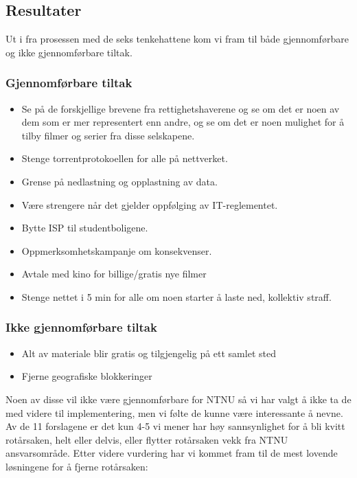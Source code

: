 \subsection{Resultater}
Ut i fra prosessen med de seks tenkehattene kom vi fram til både gjennomførbare og ikke gjennomførbare tiltak. 
\subsubsection*{Gjennomførbare tiltak}
\begin{itemize}
    \item Se på de forskjellige brevene fra rettighetshaverene og se om det er noen av dem som er mer representert enn andre, og se om det er noen mulighet for å tilby filmer og serier fra disse selskapene.
    \item Stenge torrentprotokoellen for alle på nettverket.
    \item Grense på nedlastning og opplastning av data.
    \item Være strengere når det gjelder oppfølging av IT-reglementet. 
    \item Bytte ISP til studentboligene.
    \item Oppmerksomhetskampanje om konsekvenser.
    \item Avtale med kino for billige/gratis nye filmer
    \item Stenge nettet i 5 min for alle om noen starter å laste ned, kollektiv straff. %
\end{itemize}

\subsubsection*{Ikke gjennomførbare tiltak}
\begin{itemize}
    \item Alt av materiale blir gratis og tilgjengelig på ett samlet sted
    \item Fjerne geografiske blokkeringer
\end{itemize}

Noen av disse vil ikke være gjennomførbare for NTNU så vi har valgt å ikke ta de med videre til implementering, men vi følte de kunne være interessante å nevne. Av de 11 forslagene er det kun 4-5 vi mener har høy sannsynlighet for å bli kvitt rotårsaken, helt eller delvis, eller flytter rotårsaken vekk fra NTNU ansvarsområde. Etter videre vurdering har vi kommet fram til de mest lovende løsningene for å fjerne rotårsaken: 
